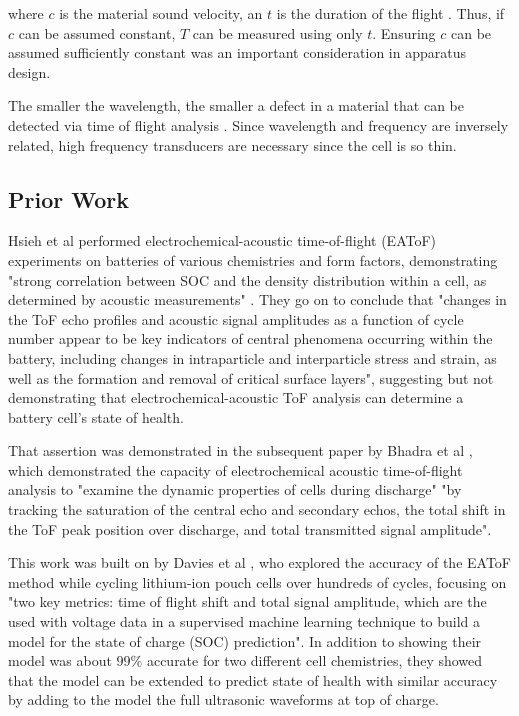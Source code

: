 where $c$ is the material sound velocity, an $t$ is the duration of the flight \cite{OLYMPUS}. 
Thus, if $c$ can be assumed constant, $T$ can be measured using only $t$.
Ensuring $c$ can be assumed sufficiently constant was an important consideration in apparatus design.

The smaller the wavelength, the smaller a defect in a material that can be detected via time of flight analysis \cite{OLYMPUS}. Since wavelength and frequency are inversely related, high frequency transducers are necessary since the cell is so thin.

\subsection{Prior Work}

Hsieh et al  performed electrochemical-acoustic time-of-flight (EAToF) experiments on batteries of various chemistries and form factors, demonstrating "strong correlation between SOC and the density distribution within a cell, as determined by acoustic measurements" \cite{TOF-STATE}. They go on to conclude that "changes in the ToF echo profiles and acoustic signal amplitudes as a function of cycle number appear to be key indicators of central phenomena occurring within the battery, including changes in intraparticle and interparticle stress and strain, as well as the formation and removal of critical surface layers", suggesting but not demonstrating that electrochemical-acoustic ToF analysis can determine a battery cell's state of health.

That assertion was demonstrated in the subsequent paper by Bhadra et al  \cite{ANODE-CHAR}, which demonstrated the capacity of electrochemical acoustic time-of-flight analysis to "examine the dynamic properties of cells during discharge" "by tracking the saturation of the central echo and secondary echos, the total shift in the ToF peak position over discharge, and total transmitted signal amplitude".

This work was built on by Davies et al  \cite{SOC-SOH-EST}, who explored the accuracy of the EAToF method while cycling lithium-ion pouch cells over hundreds of cycles, focusing on "two key metrics: time of flight shift and total signal amplitude, which are the used with voltage data in a supervised machine learning technique to build a model for the state of charge (SOC) prediction". 
In addition to showing their model was about $99\%$ accurate for two different cell chemistries, they showed that the model can be extended to predict state of health with similar accuracy by adding to the model the full ultrasonic waveforms at top of charge.